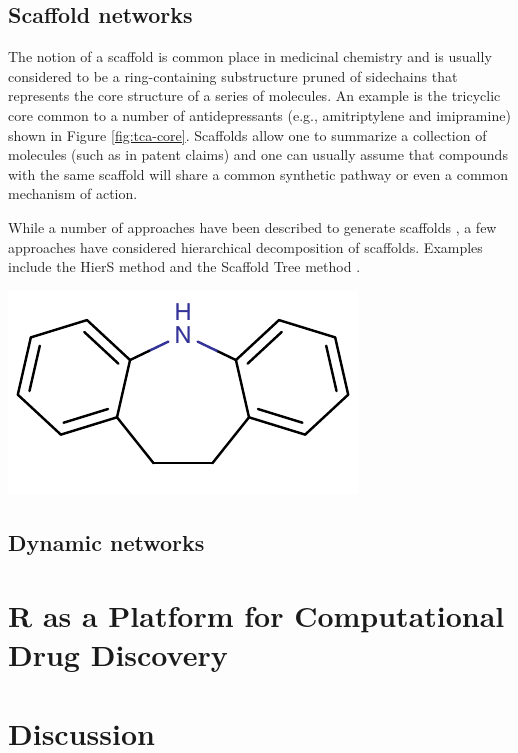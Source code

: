\documentclass[12pt,letterpaper]{article}
\begin{document}
\subsection{Scaffold networks}
\label{sec:scaffold-networks}

The notion of a scaffold is common place in medicinal chemistry and is
usually considered to be a ring-containing substructure pruned of
sidechains that represents the core structure of a series of
molecules. An example is the tricyclic core common to a number of
antidepressants (e.g., amitriptylene and imipramine) shown in Figure
\ref{fig:tca-core}. Scaffolds allow one to summarize a collection of
molecules (such as in patent claims) and one can usually assume that
compounds with the same scaffold will share a common synthetic pathway
or even a common mechanism of action.

While a number of approaches have been described to generate scaffolds
\cite{Lewell:1998aa,Bemis:1996aa,Katritzky:2000wf}, a few approaches
have considered hierarchical decomposition of scaffolds. Examples
include the HierS method \cite{Wilkens:2005il} and the Scaffold Tree
method \cite{Schuffenhauer:2007oz}.

{}
{\includegraphics{img/tca-core}}

\subsection{Dynamic networks}
\label{sec:dynamic-networks}


\section{R as a Platform for Computational Drug Discovery}
\label{sec:r-as-platform}

\section{Discussion}
\label{sec:summary}
\end{document}
